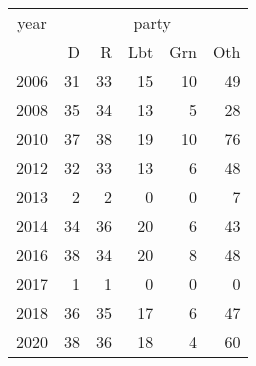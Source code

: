 \footnotesize\begin{tabular}[t]{lrrrrr}
\toprule
\multicolumn{1}{c}{year} & \multicolumn{5}{c}{party} \\
\cmidrule(l{3pt}r{3pt}){1-1} \cmidrule(l{3pt}r{3pt}){2-6}
  & D & R & Lbt & Grn & Oth\\
\midrule
2006 & 31 & 33 & 15 & 10 & 49\\
2008 & 35 & 34 & 13 & 5 & 28\\
2010 & 37 & 38 & 19 & 10 & 76\\
2012 & 32 & 33 & 13 & 6 & 48\\
2013 & 2 & 2 & 0 & 0 & 7\\
2014 & 34 & 36 & 20 & 6 & 43\\
2016 & 38 & 34 & 20 & 8 & 48\\
2017 & 1 & 1 & 0 & 0 & 0\\
2018 & 36 & 35 & 17 & 6 & 47\\
2020 & 38 & 36 & 18 & 4 & 60\\
\bottomrule
\end{tabular}
